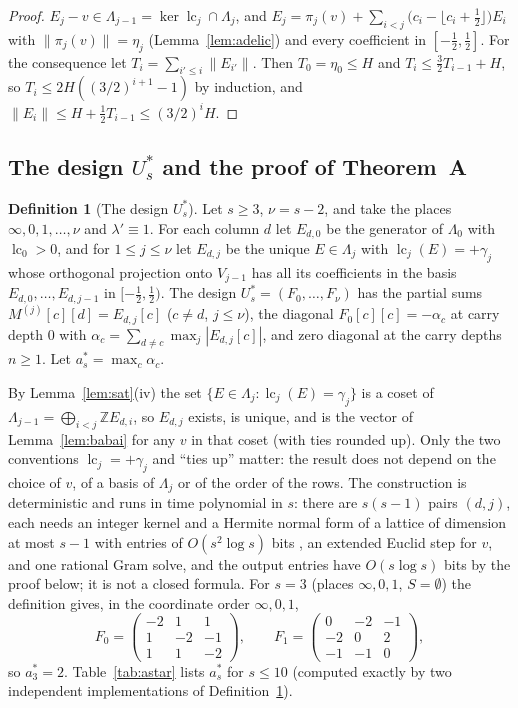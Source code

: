 \documentclass[11pt]{amsart}
\theoremstyle{definition}
\newtheorem{definition}[theorem]{Definition}
\theoremstyle{plain}
\newcommand{\Z}{\mathbb{Z}}
\begin{document}
\begin{proof}
$E_j-v\in\Lambda_{j-1}=\ker\operatorname{lc}_j\cap\Lambda_j$, and $E_j=\pi_j(v)+\sum_{i<j}\bigl(c_i-\lfloor c_i+\frac12\rfloor\bigr)E_i$ with $\|\pi_j(v)\|=\eta_j$ (Lemma~\ref{lem:adelic}) and every coefficient in $[-\frac12,\frac12]$. For the consequence let $T_i=\sum_{i'\le i}\|E_{i'}\|$. Then $T_0=\eta_0\le H$ and $T_i\le\frac32T_{i-1}+H$, so $T_i\le2H((3/2)^{i+1}-1)$ by induction, and $\|E_i\|\le H+\frac12T_{i-1}\le(3/2)^iH$.
\end{proof}

\subsection{The design \texorpdfstring{$U^*_s$}{U*s} and the proof of Theorem~A}\label{sec:Ustar}
\begin{definition}[The design $U^*_s$]\label{def:Ustar}
Let $s\ge3$, $\nu=s-2$, and take the places $\infty,0,1,\dots,\nu$ and $\lambda'\equiv1$. For each column $d$ let $E_{d,0}$ be the generator of $\Lambda_0$ with $\operatorname{lc}_0>0$, and for $1\le j\le \nu$ let $E_{d,j}$ be the unique $E\in\Lambda_j$ with $\operatorname{lc}_j(E)=+\gamma_j$ whose orthogonal projection onto $V_{j-1}$ has all its coefficients in the basis $E_{d,0},\dots,E_{d,j-1}$ in $[-\frac12,\frac12)$. The design $U^*_s=(F_0,\dots,F_\nu)$ has the partial sums $M^{(j)}[c][d]=E_{d,j}[c]$ ($c\ne d$, $j\le \nu$), the diagonal $F_0[c][c]=-\alpha_c$ at carry depth $0$ with $\alpha_c=\sum_{d\ne c}\max_j|E_{d,j}[c]|$, and zero diagonal at the carry depths $n\ge1$. Let $a^*_s=\max_c\alpha_c$.
\end{definition}

By Lemma~\ref{lem:sat}(iv) the set $\{E\in\Lambda_j:\operatorname{lc}_j(E)=\gamma_j\}$ is a coset of $\Lambda_{j-1}=\bigoplus_{i<j}\Z E_{d,i}$, so $E_{d,j}$ exists, is unique, and is the vector of Lemma~\ref{lem:babai} for any $v$ in that coset (with ties rounded up). Only the two conventions $\operatorname{lc}_j=+\gamma_j$ and ``ties up'' matter: the result does not depend on the choice of $v$, of a basis of $\Lambda_j$ or of the order of the rows. The construction is deterministic and runs in time polynomial in $s$: there are $s(s-1)$ pairs $(d,j)$, each needs an integer kernel and a Hermite normal form of a lattice of dimension at most $s-1$ with entries of $O(s^2\log s)$ bits \cite{KB79}, an extended Euclid step for $v$, and one rational Gram solve, and the output entries have $O(s\log s)$ bits by the proof below; it is not a closed formula. For $s=3$ (places $\infty,0,1$, $S=\emptyset$) the definition gives, in the coordinate order $\infty,0,1$,
\[
F_0=\begin{pmatrix}-2&1&1\\1&-2&-1\\1&1&-2\end{pmatrix},\qquad F_1=\begin{pmatrix}0&-2&-1\\-2&0&2\\-1&-1&0\end{pmatrix},
\]
so $a^*_3=2$. Table~\ref{tab:astar} lists $a^*_s$ for $s\le10$ (computed exactly by two independent implementations of Definition~\ref{def:Ustar}).
\end{document}
